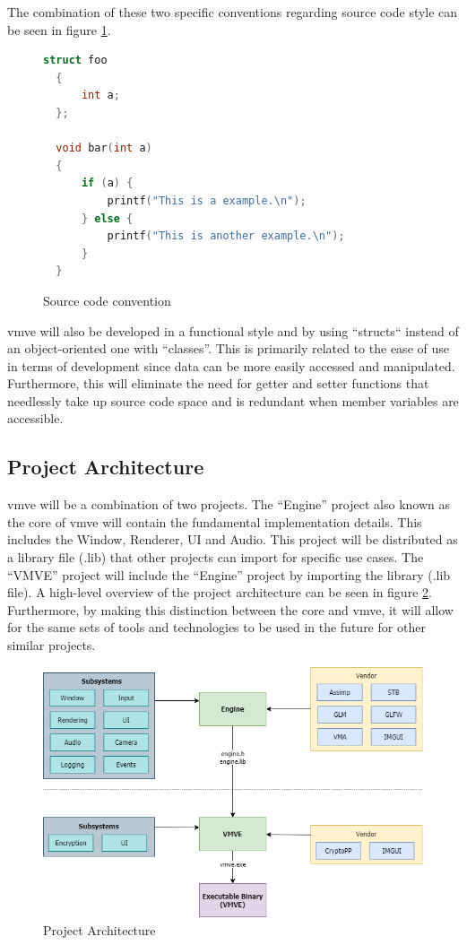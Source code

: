 \documentclass[11pt]{article}
\begin{document}
The combination of these two specific conventions regarding source code style
can be seen in figure \ref{fig:convention}.

\begin{figure}[H]
\centering
\begin{lstlisting}[language=C++]
  struct foo
  {
      int a;
  };

  void bar(int a)
  {
      if (a) {
          printf("This is a example.\n");
      } else {
          printf("This is another example.\n");
      }
  }
\end{lstlisting}
\caption{Source code convention}
\label{fig:convention}
\end{figure}

\gls*{vmve} will also be developed in a functional style and by using ``structs``
instead of an object-oriented one with ``classes''. This is primarily related to
the ease of use in terms of development since data can be more easily accessed
and manipulated. Furthermore, this will eliminate the need for getter and setter
functions that needlessly take up source code space and is redundant when member
variables are accessible.

\subsection{Project Architecture}

\gls*{vmve} will be a combination of two projects. The ``Engine'' project also
known as the core of \gls*{vmve} will contain the fundamental implementation
details. This includes the Window, Renderer, UI and Audio. This project will be
distributed as a library file (.lib) that other projects can import for specific
use cases. The ``VMVE'' project will include the ``Engine'' project by importing
the library (.lib file). A high-level overview of the project architecture can
be seen in figure \ref{fig:projarch}. Furthermore, by making this distinction
between the core and \gls*{vmve}, it will allow for the same sets of tools and
technologies to be used in the future for other similar projects.

\begin{figure}[H]
  \centering
  \includegraphics[width=\textwidth]{images/project_architecture.png}
  \caption{Project Architecture}
  \label{fig:projarch}
\end{figure}
\end{document}
